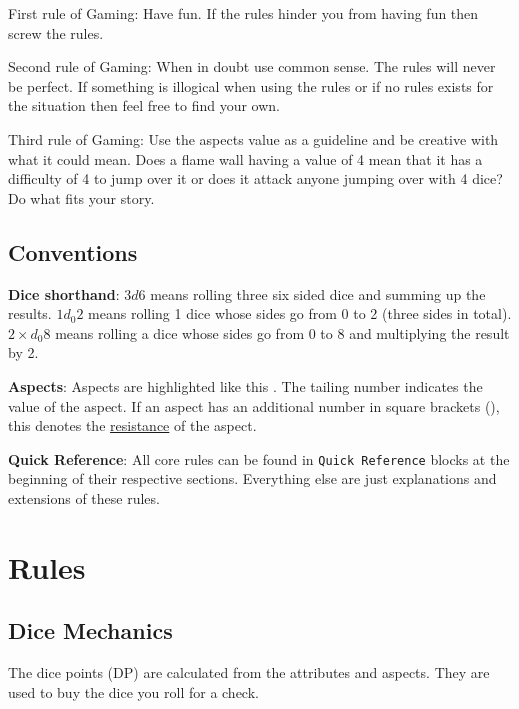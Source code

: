 \documentclass[11pt]{article}
\begin{document}
{First rule of Gaming: Have fun. If the rules hinder you from having fun then screw the rules.

Second rule of Gaming: When in doubt use common sense. The rules will never be perfect. If something is illogical when using the rules or if no rules exists for the situation then feel free to find your own. 

Third rule of Gaming: Use the aspects value as a guideline and be creative with what it could mean. Does a flame wall having a value of 4 mean that it has a difficulty of 4 to jump over it or does it attack anyone jumping over with 4 dice? Do what fits your story. 
\subsection{Conventions}
\label{sec:org1a3f1fb}
\textbf{Dice shorthand}: \(3 d 6\) means rolling three six sided dice and summing up the results. \(1 d_0 2\) means rolling 1 dice whose sides go from 0 to 2 (three sides in total). \(2 \times d_0 8\) means rolling a dice whose sides go from 0 to 8 and multiplying the result by 2.

\textbf{Aspects}: Aspects are highlighted like this . The tailing number indicates the value of the aspect. If an aspect has an additional number in square brackets (), this denotes the \hyperref[sec:org1ce70b8]{resistance} of the aspect. 

\textbf{Quick Reference}: All core rules can be found in \texttt{Quick Reference} blocks at the beginning of their respective sections. Everything else are just explanations and extensions of these rules.
\section{Rules}
\label{sec:orgeae77a8}

\subsection{Dice Mechanics}
\label{sec:org3b977a0}
\begin{short}
The dice points (DP) are calculated from the attributes and aspects. They are used to buy the dice you roll for a check.


\end{short}}
\end{document}
